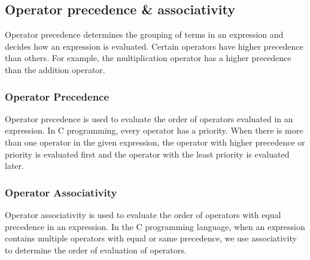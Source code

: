 \subsection{Operator precedence \& associativity}
Operator precedence determines the grouping of terms in an expression and decides how an expression is evaluated. Certain operators have higher precedence than others. For example, the multiplication operator has a higher precedence than the addition operator.

\subsubsection{Operator Precedence}
Operator precedence is used to evaluate the order of operators evaluated in an expression. In C programming, every operator has a priority. When there is more than one operator in the given expression, the operator with higher precedence or priority is evaluated first and the operator with the least priority is evaluated later.

\subsubsection{Operator Associativity}
Operator associativity is used to evaluate the order of operators with equal precedence in an expression. In the C programming language, when an expression contains multiple operators with equal or same precedence, we use associativity to determine the order of evaluation of operators.

